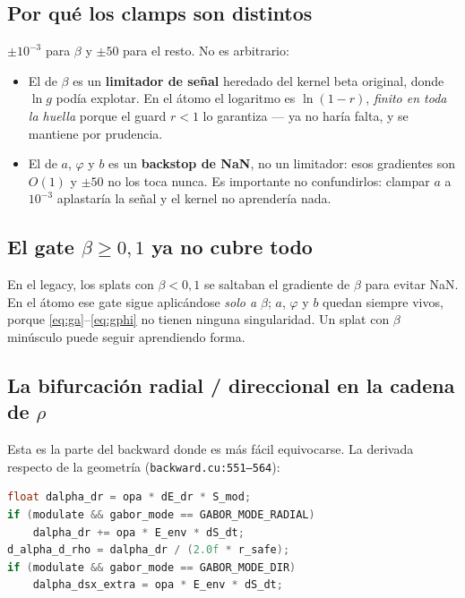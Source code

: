 \documentclass[12pt]{extarticle}
\newcommand{\code}[1]{\texttt{#1}}
\begin{document}
\subsection{Por qué los clamps son distintos}

$\pm10^{-3}$ para $\beta$ y $\pm50$ para el resto. No es arbitrario:

\begin{itemize}
\item El de $\beta$ es un \textbf{limitador de señal} heredado del kernel beta
      original, donde $\ln g$ podía explotar. En el átomo el logaritmo es
      $\ln(1-r)$, \emph{finito en toda la huella} porque el guard $r<1$ lo
      garantiza --- ya no haría falta, y se mantiene por prudencia.
\item El de $a$, $\varphi$ y $b$ es un \textbf{backstop de NaN}, no un
      limitador: esos gradientes son $O(1)$ y $\pm50$ no los toca nunca. Es
      importante no confundirlos: clampar $a$ a $10^{-3}$ aplastaría la señal
      y el kernel no aprendería nada.
\end{itemize}

\subsection{El gate $\beta\ge0{,}1$ ya no cubre todo}

En el legacy, los splats con $\beta<0{,}1$ se saltaban el gradiente de $\beta$
para evitar NaN. En el átomo ese gate sigue aplicándose \emph{solo a $\beta$};
$a$, $\varphi$ y $b$ quedan siempre vivos, porque \eqref{eq:ga}--\eqref{eq:gphi}
no tienen ninguna singularidad. Un splat con $\beta$ minúsculo puede seguir
aprendiendo forma.

\subsection{La bifurcación radial / direccional en la cadena de $\rho$}

Esta es la parte del backward donde es más fácil equivocarse. La derivada
respecto de la geometría (\code{backward.cu:551--564}):

\begin{lstlisting}[language=C]
float dalpha_dr = opa * dE_dr * S_mod;
if (modulate && gabor_mode == GABOR_MODE_RADIAL)
    dalpha_dr += opa * E_env * dS_dt;
d_alpha_d_rho = dalpha_dr / (2.0f * r_safe);
if (modulate && gabor_mode == GABOR_MODE_DIR)
    dalpha_dsx_extra = opa * E_env * dS_dt;
\end{lstlisting}
\end{document}
